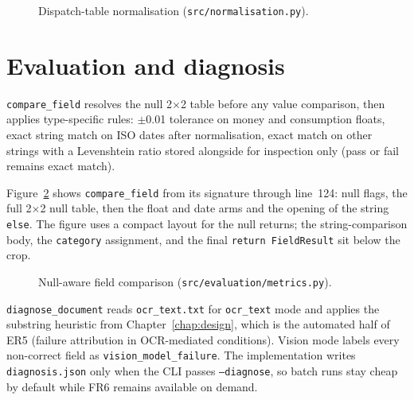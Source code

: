 \begin{figure}[ht]
    \centering
    \caption{Dispatch-table normalisation (\texttt{src/normalisation.py}).}
    \label{fig:impl-normalisers}
\end{figure}


\section{Evaluation and diagnosis}
\label{sec:impl-evaldiag}

\texttt{compare\_field} resolves the null 2$\times$2 table before
any value comparison, then applies type-specific rules: $\pm$0.01
tolerance on money and consumption floats, exact string match on
ISO dates after normalisation, exact match on other strings with a
Levenshtein ratio stored alongside for inspection only (pass or
fail remains exact match).

Figure~\ref{fig:impl-compare-field} shows \texttt{compare\_field} from
its signature through line~124: null flags, the full 2$\times$2 null
table, then the float and date arms and the opening of the string
\texttt{else}. The figure uses a compact layout for the null returns;
the string-comparison body, the \texttt{category} assignment, and the
final \texttt{return FieldResult} sit below the crop.

\begin{figure}[ht]
    \centering
    \caption{Null-aware field comparison (\texttt{src/evaluation/metrics.py}).}
    \label{fig:impl-compare-field}
\end{figure}


\texttt{diagnose\_document} reads \texttt{ocr\_text.txt} for
\texttt{ocr\_text} mode and applies the substring heuristic from
Chapter~\ref{chap:design}, which is the automated half of ER5
(failure attribution in OCR-mediated conditions). Vision mode labels
every non-correct field as \texttt{vision\_model\_failure}. The
implementation writes \texttt{diagnosis.json} only when the CLI passes
\texttt{--diagnose}, so batch runs stay cheap by default while FR6
remains available on demand.

